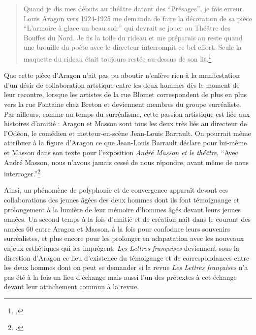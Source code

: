\begin{quote}
Quand je dis mes débuts au théâtre datant des \enquote{Présages}, je fais erreur. Louis Aragon vers 1924-1925 me demanda de faire la décoration de sa pièce \enquote{L'armoire à glace un beau soir} qui devrait se jouer au Théâtre des Bouffes du Nord. Je fis la toile du rideau et me préparais au reste quand une brouille du poète avec le directeur interrompit ce bel effort. Seule la maquette du rideau était toujours restée au-dessus de son lit.\footcite[p19]{catalogue}
\end{quote}
	
	 Que cette pièce d'Aragon n'ait pas pu aboutir n'enlève rien à la manifestation d'un désir de collaboration artstique entre les deux hommes dès le moment de leur recontre, lorsque les artistes de la rue Blomet correspondent de plus en plus vers la rue Fontaine chez Breton et deviennent membres du groupe surréaliste. Par ailleurs, comme au temps du surréalisme, cette passion artistique est liée aux histoires d’amitié : Aragon et Masson sont tous les deux très liés au directeur de l’Odéon, le comédien et metteur-en-scène Jean-Louis Barrault. On pourrait même attribuer à la figure d'Aragon ce que Jean-Louis Barrault déclare pour lui-même et Masson dans son texte pour l'exposition \emph{André Masson et le théâtre}, \enquote{Avec André Masson, nous n'avons jamais cessé de nous répondre, avant même de nous interroger.}\footcite[p90]{catalogue}


	 Ainsi, un phénomène de polyphonie et de convergence apparaît devant ces collaborations des jeunes âgées des deux hommes dont ils font témoignange et prolongement à la lumière de leur mémoire d'hommes âgés devant leurs jeunes années. Un second temps à la fois d'amitié et de création naît dans le courant des années 60 entre Aragon et Masson, à la fois pour confodnre leurs souvenirs surréalistes, et plus encore pour les prolonger en adapatation avec les nouveaux enjeux esthétiques qui les imprègent. \emph{Les Lettres françaises} deviennent sous la direction d'Aragon ce lieu d'existence du témoigange et de correspondances entre les deux hommes dont on peut se demander si la revue \emph{Les Lettres françaises} n'a pas été à la fois un lieu d'échange mais aussi l'un des prétextes à cet échange devant leur attachement commun à la revue. 

 